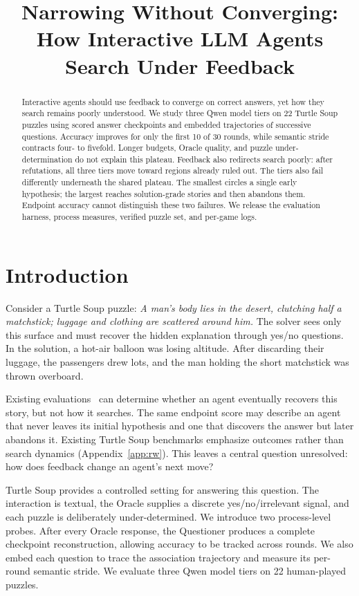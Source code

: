 \documentclass{article}
\title{Narrowing Without Converging:\\ How Interactive LLM Agents Search Under Feedback}
\author{}
\begin{document}
\maketitle

\begin{abstract}
Interactive agents should use feedback to converge on correct answers, yet how
they search remains poorly understood. We study three Qwen model tiers on 22
Turtle Soup puzzles using scored answer checkpoints and embedded trajectories
of successive questions. Accuracy improves for only the first 10 of 30 rounds,
while semantic stride contracts four- to fivefold. Longer budgets, Oracle
quality, and puzzle under-determination do not explain this plateau. Feedback
also redirects search poorly: after refutations, all three tiers move toward
regions already ruled out. The tiers also fail differently underneath the shared
plateau. The smallest circles a single early hypothesis; the largest reaches
solution-grade stories and then abandons them. Endpoint accuracy cannot
distinguish these two failures. We release the evaluation harness,
process measures, verified puzzle set, and per-game logs.
\end{abstract}

\section{Introduction}

Consider a Turtle Soup puzzle: \emph{A man's body lies in the desert,
clutching half a matchstick; luggage and clothing are scattered around him.}
The solver sees only this surface and must recover the hidden explanation
through yes/no questions. In the solution, a hot-air balloon was losing
altitude. After discarding their luggage, the passengers drew lots, and the
man holding the short matchstick was thrown overboard.

Existing evaluations~\cite{turtlebench,splat,tsbench} can determine whether an agent eventually recovers this
story, but not how it searches. The same endpoint score may describe an agent
that never leaves its initial hypothesis and one that discovers the answer but
later abandons it. 
Existing Turtle Soup benchmarks emphasize outcomes rather
than search dynamics (Appendix~\ref{app:rw}).
This leaves a central question unresolved: how does feedback change an agent's
next move?

Turtle Soup provides a controlled setting for answering this question. The
interaction is textual, the Oracle supplies a discrete yes/no/irrelevant
signal, and each puzzle is deliberately under-determined. We introduce two
process-level probes. After every Oracle response, the Questioner produces a
complete checkpoint reconstruction, allowing accuracy to be tracked across
rounds. We also embed each question to trace the association trajectory and
measure its per-round semantic stride. We evaluate three Qwen model tiers on
22 human-played puzzles.
\end{document}
